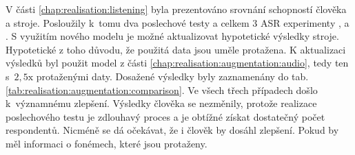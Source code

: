 V části \ref{chap:realisation:listening} byla prezentováno srovnání schopností člověka a stroje.
Posloužily k~tomu dva poslechové testy a celkem $3$ ASR experimenty ,  a .
S využitím nového modelu je možné aktualizovat hypotetické výsledky stroje.
Hypotetické z toho důvodu, že použitá data jsou uměle protažena.
K aktualizaci výsledků byl použit
model z části \ref{chap:realisation:augmentation:audio}, tedy ten s~$2,5\mathrm{x}$ protaženými daty.
Dosažené výsledky byly zaznamenány do tab. \ref{tab:realisation:augmentation:comparison}.
Ve všech třech případech došlo  k~významnému zlepšení.
Výsledky člověka se nezměnily, protože realizace poslechového testu je zdlouhavý proces a je obtížné získat dostatečný počet respondentů.
Nicméně se dá očekávat, že i člověk by dosáhl zlepšení.
Pokud by měl informaci o fonémech, které jsou protaženy.



